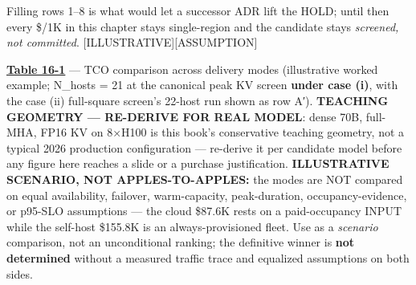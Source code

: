 Filling rows 1--8 is what would let a successor ADR lift the HOLD; until
then every \$/1K in this chapter stays single-region and the candidate
stays \emph{screened, not committed}. \mbox{{[}ILLUSTRATIVE{]}}\hspace{0pt}\mbox{{[}ASSUMPTION{]}}

\textbf{\hyperref[tab:16.1]{Table 16-1}} --- TCO comparison across delivery modes
(illustrative worked example; N\_hosts = 21 at the canonical peak KV
screen \textbf{under case (i)}, with the case (ii) full-square screen's
22-host run shown as row A′). \textbf{TEACHING GEOMETRY --- RE-DERIVE
FOR REAL MODEL}: dense 70B, full-MHA, FP16 KV on 8×H100 is this book's
conservative teaching geometry, not a typical 2026 production
configuration --- re-derive it per candidate model before any figure
here reaches a slide or a purchase justification. \textbf{ILLUSTRATIVE
SCENARIO, NOT APPLES-TO-APPLES:} the modes are NOT compared on equal
availability, failover, warm-capacity, peak-duration,
occupancy-evidence, or p95-SLO assumptions --- the cloud \$87.6K rests
on a paid-occupancy INPUT while the self-host \$155.8K is an
always-provisioned fleet. Use as a \emph{scenario} comparison, not an
unconditional ranking; the definitive winner is \textbf{not determined}
without a measured traffic trace and equalized assumptions on both
sides.

